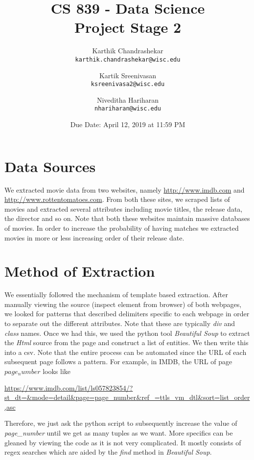 \documentclass[]{article}
\title{CS 839 - Data Science \\ Project Stage 2}
\date{Due Date: April 12, 2019 at 11:59 PM}
\author
{
	Karthik Chandrashekar \\
	\texttt{karthik.chandrashekar@wisc.edu} \\
	\and
	Kartik Sreenivasan \\
	\texttt{ksreenivasa2@wisc.edu}\\
	\and
	Niveditha Hariharan \\
	\texttt{nhariharan@wisc.edu}\\
}
\begin{document}
\maketitle

\section{Data Sources}
We extracted movie data from two websites, namely \url{http://www.imdb.com} and \url{http://www.rottentomatoes.com}. From both these sites, we scraped lists of movies and extracted several attributes including movie titles, the release data, the director and so on. Note that both these websites maintain massive databases of movies. In order to increase the probability of having matches we extracted movies in more or less increasing order of their release date.

\section{Method of Extraction}
We essentially followed the mechanism of template based extraction. After manually viewing the source (inspect element from browser) of both webpages,  we looked for patterns that described delimiters specific to each webpage in order to separate out the different attributes. Note that these are typically \textit{div} and \textit{class} names. Once we had this, we used the python tool \emph{Beautiful Soup} to extract the \textit{Html} source from the page and construct a list of entities. We then write this into a csv. Note that the entire process can be automated since the URL of each subsequent page follows a pattern. For example, in IMDB, the URL of page $page_number$ looks like

\url{https://www.imdb.com/list/ls057823854/?st_dt=&mode=detail&page=page_number&ref_=ttls_vm_dtl&sort=list_order,asc}

Therefore, we just ask the python script to subsequently increase the value of \textit{page\_number} until we get as many tuples as we want. More specifics can be gleaned by viewing the code as it is not very complicated. It mostly consists of regex searches which are aided by the \emph{find} method in \emph{Beautiful Soup}.
\end{document}
